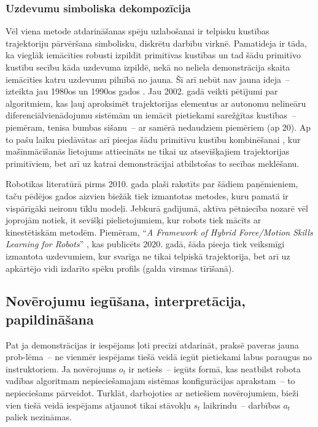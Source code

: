 \documentclass[12pt, a4paper]{article}
\numberwithin{equation}{section} %
\begin{document}
\subsubsection{Uzdevumu simboliska dekompozīcija}

Vēl viena metode atdarināšanas spēju uzlabošanai ir telpisku kustības trajektoriju pārvēršana simbolisku, diskrētu darbību virknē. Pamatideja ir tāda, ka vieglāk iemācīties robusti izpildīt primitīvas kustības un tad šādu primitīvo kustību secību kāda uzdevuma izpildē, nekā no neliela demonstrācija skaita iemācīties katru uzdevumu pilnībā no jauna. Šī arī nebūt nav jauna ideja~-- izteikta jau 1980os un 1990os gados \cite{muench1994robot}. Jau 2002. gadā veikti pētījumi par algoritmiem, kas ļauj aproksimēt trajektorijas elementus ar autonomu nelineāru diferenciālvienādojumu sistēmām \cite{ijspeert2002movement} un iemācīt pietiekami sarežģītas kustības~-- piemēram, tenisa bumbas sišanu~-- ar samērā nedaudziem piemēriem (ap 20). Ap to pašu laiku piedāvātas arī pieejas šādu primitīvu kustību kombinēšanai \cite{schaal2003computational}, kur mašīnmācīšanās lietojums attiecināts ne tikai uz atsevišķajiem trajektorijas primitīviem, bet arī uz katrai demonstrācijai atbilstošas to secības meklēšanu.

Robotikas literatūrā pirms 2010. gada \cite{billard2008handbook} plaši rakstīts par šādiem paņēmieniem, taču pēdējos gados aizvien biežāk tiek izmantotas metodes, kuru pamatā ir vispārīgāki neironu tīklu modeļi. Jebkurā gadījumā, aktīva pētniecība nozarē vēl joprojām notiek, it sevišķi pielietojumiem, kur robots tiek mācīts ar kinestētiskām metodēm. Piemēram, ``\textit{A Framework of Hybrid Force/Motion Skills Learning for Robots}'' \cite{wang2020framework}, kas publicēts 2020. gadā, šāda pieeja tiek veiksmīgi izmantota uzdevumiem, kur svarīga ne tikai telpiskā trajektorija, bet arī uz apkārtējo vidi izdarīto spēku profils (galda virsmas tīrīšanā).

\subsection{Novērojumu iegūšana, interpretācija, papildināšana}

Pat ja demonstrācijas ir iespējams ļoti precīzi atdarināt, praksē paveras jauna prob-lēma~-- ne vienmēr iespējams tiešā veidā iegūt pietiekami labus paraugus no instruktoriem. Ja novērojums $o_t$ ir netiešs~-- iegūts formā, kas neatbilst robota vadības algoritmam nepieciešamajam sistēmas konfigurācijas aprakstam~-- to nepieciešams pārveidot. Turklāt, darbojoties ar netiešiem novērojumiem, bieži vien tiešā veidā iespējams atjaunot tikai stāvokļu $s_t$ laikrindu~-- darbības $a_t$ paliek nezināmas.
\end{document}
